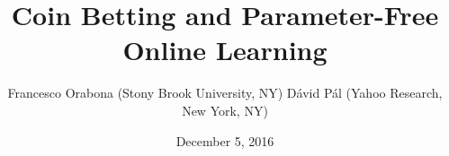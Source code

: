 \documentclass[30pt,landscape]{sciposter}
\begin{document}
\renewcommand{\thefootnote}{\fnsymbol{footnote}}
\renewcommand{\footlogo}{Typeset by pdf\LaTeX}
\renewcommand{\algorithmicrequire}{\textbf{Input:}}

\title{Coin Betting and Parameter-Free Online Learning}
\author{Francesco Orabona (Stony Brook University, NY) \qquad \qquad D\'avid P\'al (Yahoo Research, New York, NY)}

\date{December 5, 2016}


\maketitle
\end{document}
